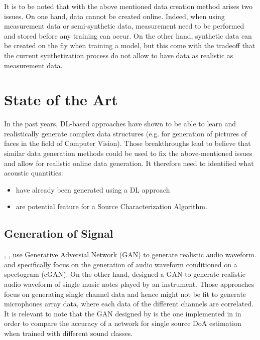 \documentclass[11pt,a4paper,twoside]{report}
\begin{document}
It is to be noted that with the above mentioned data creation method arises two issues. On one hand, data cannot be created online. Indeed, when using measurement data or semi-synthetic data, measurement need to be performed and stored before any training can occur. On the other hand, synthetic data can be created on the fly when training a model, but this come with the tradeoff that the current synthetization process do not allow to have data as realistic as measurement data.

\section{State of the Art}

In the past years, DL-based approaches have shown to be able to learn and realistically generate complex data structures (e.g. \cite{karras2017progressive} for generation of pictures of faces in the field of Computer Vision). Those breakthroughs lead to believe that similar data generation methods could be used to fix the above-mentioned issues and allow for realistic online data generation. It therefore need to identified what acoustic quantities:
\begin{itemize}
    \item have already been generated using a DL approach
    \item are potential feature for a Source Characterization Algorithm.
\end{itemize}

\subsection{Generation of Signal}

\cite{neekhara2019expediting}, \cite{NEURIPS2019_6804c9bc}, \cite{engel2019gansynth} use Generative Adversial Network (GAN) to generate realistic audio waveform. \cite{neekhara2019expediting} and \cite{NEURIPS2019_6804c9bc} specifically focus on the generation of audio waveform conditioned on a spectogram (cGAN). On the other hand, \cite{engel2019gansynth} designed a GAN to generate realistic audio waveform of single music notes played by an instrument. Those approaches focus on generating single channel data and hence might not be fit to generate microphones array data, where each data of the different channels are correlated. It is relevant to note that the GAN designed by \cite{neekhara2019expediting} is the one implemented in \cite{vargas2021improved} in order to compare the accuracy of a network for single source DoA estimation when trained with different sound classes.
\end{document}
